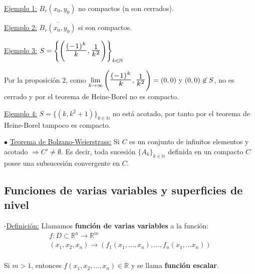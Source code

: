 \documentclass[12pt, titlepage]{article}
\newcommand{\R}{\mathbb{R}}
\newcommand{\N}{\mathbb{N}}
\newcommand{\bfrac}[2]{\scalebox{1.4}{$\frac{#1}{#2}$}}
\begin{document}
\underline{Ejemplo 1:} $B_r (x_0, y_0)$ no compactos (n son cerrados).
\vspace{3mm}

\underline{Ejemplo 2:} $\overline{B_r (x_0, y_0)}$ si son compactos.
\vspace{3mm}

\underline{Ejemplo 3:} $S = \left \{ \left ( \bfrac{(-1)^k}{k}, \bfrac{1}{k^2} \right ) \right  \}_{k \in \N}$

\indent \indent Por la proposición 2, como $\displaystyle \lim_{k \to \infty} \left ( \bfrac{(-1)^k}{k},
 \bfrac{1}{k^2} \right ) = (0, 0) \text{ y } (0, 0) \not\in S$, \indent \indent no es  cerrado y por el teorema 
de Heine-Borel no es compacto.
\vspace{3mm}

\underline{Ejemplo 4:} $S = \{(k, k^2+1)\}_{k \in \N}$ no está acotado, por tanto por el teorema \indent
 de Heine-Borel tampoco es compacto.
\vspace{5mm}


\noindent$\bullet$ \underline{Teorema de Bolzano-Weierstrass:} Si $C$ es un conjunto de infinitos 
elementos y acotado $\Rightarrow C' \neq \emptyset$. Es decir, toda sucesión $\{A_k\}_{k \in \N}$ definida 
en un compacto $C$ posee una subsucesión convergente en $C$.
\vspace{3mm}


\subsection{Funciones de varias variables y superficies de nivel}
\vspace{5mm}

\noindent-\underline{Definición:} Llamamos \textbf{función de varias variables} a la función:
\[
\boxed{
\begin{array}{c}

f : D \subset \R^n \to \R^m \\
(x_1, x_2, x_n) \to (f_1(x_1,..., x_n),..., f_n(x_1,...x_n))\\

\end{array}
}
\]

Si $m > 1$, entonces $f (x_1, x_2,..., x_n) \in \R$ y se llama \textbf{función escalar}.
\vspace{3mm}
\end{document}
